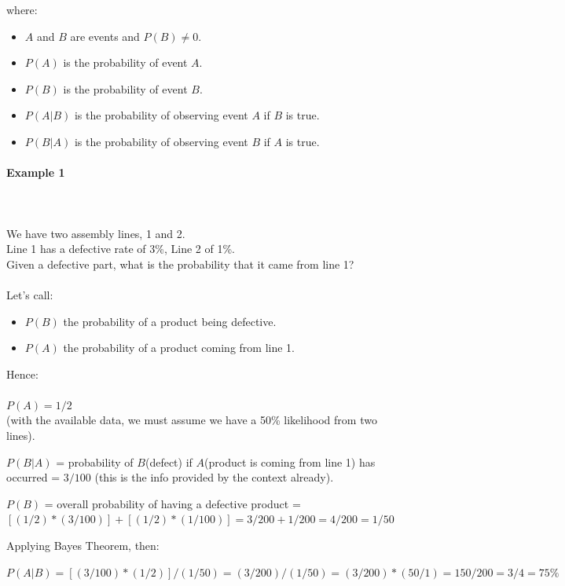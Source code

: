 \documentclass{article}
\begin{document}
where: 
\begin{itemize}
    \item $A$ and $B$ are events and $P(B) \neq 0 $.
    \item $P(A)$ is the probability of event $A$.
    \item $P(B)$ is the probability of event $B$.
    \item $P(A | B)$ is the probability of observing event $A$ if $B$ is true.
    \item $P(B | A)$ is the probability of observing event $B$ if $A$ is true.
\end{itemize}

\paragraph{Example 1}\mbox{} \\
\mbox{} \\
We have two assembly lines, 1 and 2. \\ 
Line 1 has a defective rate of 3\%, Line 2 of 1\%. \\ 
Given a defective part, what is the probability that it came from line 1? \\ 
\mbox{} \\
Let’s call:
\begin{itemize}
    \item $P(B)$ the probability of a product being defective.
    \item $P(A)$ the probability of a product coming from line 1.
\end{itemize}
Hence: \\ 
\mbox{} \\
$P(A) = 1 / 2$ \\  
(with the available data, we must assume we have a 50\% likelihood from two lines). 

$P(B | A)$ = probability of $B$(defect) if $A$(product is coming from line 1) has occurred = $3 / 100$ (this is the info provided by the context already).

$P(B)$ = overall probability of having a defective product = $[(1 / 2) * (3 / 100)] + [(1 / 2) * (1 / 100)] =   3 / 200 + 1/ 200 = 4 / 200 = 1 / 50$

Applying Bayes Theorem, then:

$P(A | B) = [(3 / 100) * (1 / 2)] / (1 / 50) = (3 / 200) / (1 / 50) = (3 / 200) * (50 / 1) = 150 / 200 = 3 / 4 = 75\% $
\end{document}
